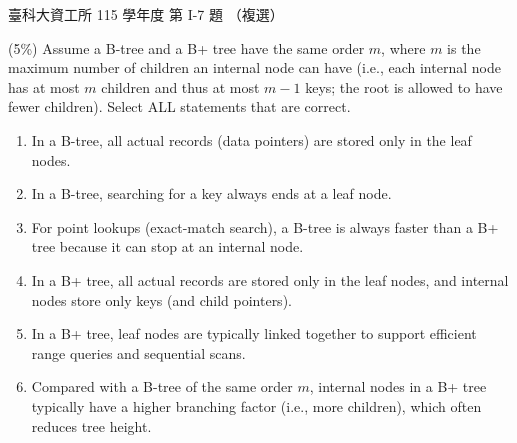 \begin{pastexam}[label={px:ntust-115-ice-07}]{臺科大資工所 115 學年度 第 I-7 題}
（複選）

(5\%) Assume a B-tree and a B+ tree have the same order $m$, where $m$ is the maximum number of children
an internal node can have (i.e., each internal node has at most $m$ children and thus at most $m-1$ keys;
the root is allowed to have fewer children). Select ALL statements that are correct.
\begin{enumerate}[label=(\alph*)]
\item In a B-tree, all actual records (data pointers) are stored only in the leaf nodes.
\item In a B-tree, searching for a key always ends at a leaf node.
\item For point lookups (exact-match search), a B-tree is always faster than a B+ tree because it can stop
at an internal node.
\item In a B+ tree, all actual records are stored only in the leaf nodes, and internal nodes store only keys
(and child pointers).
\item In a B+ tree, leaf nodes are typically linked together to support efficient range queries and
sequential scans.
\item Compared with a B-tree of the same order $m$, internal nodes in a B+ tree typically have a higher
branching factor (i.e., more children), which often reduces tree height.
\end{enumerate}
\end{pastexam}

